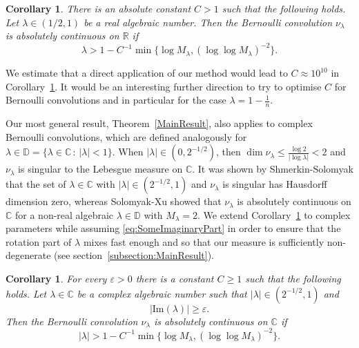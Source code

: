 \documentclass[10pt, english,oneside,reqno]{amsart}
\theoremstyle{plain}
\newtheorem{corollary}[theorem]{Corollary}
\theoremstyle{remark}
\numberwithin{equation}{section}
\numberwithin{figure}{section}
\newcommand{\R}{\mathbb{R}}
\newcommand{\C}{\mathbb{C}}
\begin{document}
    \begin{corollary}\label{BernoulliCorollary}
        There is an absolute constant $C > 1$ such that the following holds. Let $\lambda \in (1/2,1)$ be a real algebraic number. Then the Bernoulli convolution $\nu_{\lambda}$ is absolutely continuous on $\R$ if 
        \begin{equation}\label{BernoulliCond}
            \lambda > 1 - C^{-1}\min\{\log M_{\lambda},(\log \log M_{\lambda})^{-2} \} .
        \end{equation}
    \end{corollary}

    We estimate that a direct application of our method would lead to $C \approx 10^{10}$ in Corollary~\ref{BernoulliCorollary}. It would be an interesting further direction to try to optimise $C$ for Bernoulli convolutions and in particular for the case $\lambda = 1 - \frac{1}{n}$. 
    
    Our most general result, Theorem~\ref{MainResult}, also applies to complex Bernoulli convolutions, which are defined analogously for $\lambda  \in \mathbb{D} = \{ \lambda \in \C \,:\, |\lambda| < 1 \}$. When $|\lambda| \in (0,2^{-1/2})$, then $\dim \nu_{\lambda} \leq \frac{\log 2}{|\log \lambda|} < 2$ and $\nu_{\lambda}$ is singular to the Lebesgue measure on $\C$. It was shown by Shmerkin-Solomyak \cite{ShmerkinSolomyak2016} that the set of $\lambda \in \C$ with $|\lambda| \in (2^{-1/2}, 1)$ and $\nu_{\lambda}$ is singular has Hausdorff dimension zero, whereas Solomyak-Xu \cite{SolomyakXu2003} showed that $\nu_{\lambda}$ is absolutely continuous on $\C$ for a non-real algebraic $\lambda \in \mathbb{D}$ with $M_{\lambda} = 2$. We extend Corollary~\ref{BernoulliCorollary} to complex parameters while assuming \eqref{eq:SomeImaginaryPart} in order to ensure that the rotation part of $\lambda$ mixes fast enough and so that our measure is sufficiently non-degenerate (see section~\ref{subsection:MainResult}). 

    \begin{corollary}\label{ComplexBernoulliCorollary}
    For every $\varepsilon > 0$ there is a constant $C \geq 1$ such that the following holds. Let $\lambda \in \mathbb{C}$ be a complex algebraic number such that $|\lambda| \in (2^{-1/2}, 1)$ and 
    \begin{equation}
        |\mathrm{Im}(\lambda)| \geq \varepsilon. \label{eq:SomeImaginaryPart}
    \end{equation} Then the Bernoulli convolution $\nu_{\lambda}$ is absolutely continuous on $\C$ if 
    \begin{equation*}
        |\lambda| > 1 - C^{-1}\min\{\log M_{\lambda},(\log \log M_{\lambda})^{-2} \} .
    \end{equation*}
    \end{corollary}
\end{document}
